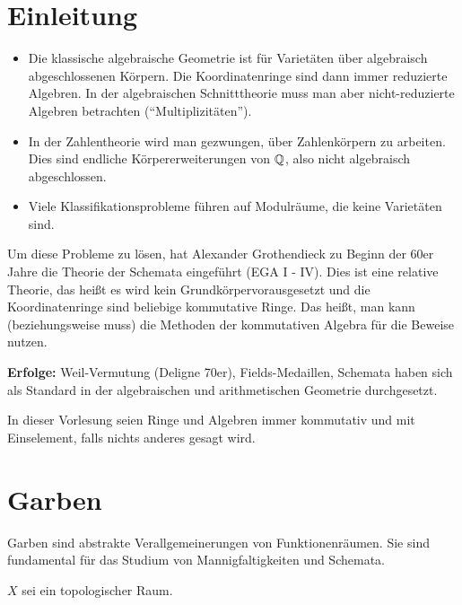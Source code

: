 \frontmatter
\chapter{Einleitung}
\begin{itemize}
	\item Die klassische algebraische Geometrie ist für Varietäten über algebraisch abgeschlossenen Körpern. Die Koordinatenringe sind dann immer reduzierte Algebren. In der algebraischen Schnitttheorie muss man aber nicht-reduzierte Algebren betrachten (\enquote{Multiplizitäten}).
	\item In der Zahlentheorie wird man gezwungen, über Zahlenkörpern zu arbeiten. Dies sind endliche Körpererweiterungen von $\mathbb {Q}$, also nicht algebraisch abgeschlossen.
	\item Viele Klassifikationsprobleme führen auf Modulräume, die keine Varietäten sind.
\end{itemize}
Um diese Probleme zu lösen, hat Alexander Grothendieck zu Beginn der 60er Jahre die Theorie der Schemata eingeführt (EGA I - IV). Dies ist eine relative Theorie, das heißt es wird kein Grundkörpervorausgesetzt und die Koordinatenringe sind beliebige kommutative Ringe. Das heißt, man kann (beziehungsweise muss) die Methoden der kommutativen Algebra für die Beweise nutzen.

\textbf{Erfolge:} Weil-Vermutung (Deligne 70er), Fields-Medaillen, Schemata haben sich als Standard in der algebraischen und arithmetischen Geometrie durchgesetzt.

In dieser Vorlesung seien Ringe und Algebren immer kommutativ und mit Einselement, falls nichts anderes gesagt wird.

\mainmatter
\chapter{Garben}
Garben sind abstrakte Verallgemeinerungen von Funktionenräumen. Sie sind fundamental für das Studium von Mannigfaltigkeiten und Schemata.

$X$ sei ein topologischer Raum.

